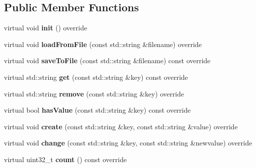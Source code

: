 \subsection*{Public Member Functions}
\begin{DoxyCompactItemize}
\item 
\mbox{\label{classbkengine_1_1INISettingsInterface_ad84a5d64d5cc69907d1cbfde8045e5c5}} 
virtual void {\bfseries init} () override
\item 
\mbox{\label{classbkengine_1_1INISettingsInterface_a08102628fa63304dd60d3dc47a38ea49}} 
virtual void {\bfseries load\+From\+File} (const std\+::string \&filename) override
\item 
\mbox{\label{classbkengine_1_1INISettingsInterface_aab677d0087cf7df2b42a2198c0700ff2}} 
virtual void {\bfseries save\+To\+File} (const std\+::string \&filename) const override
\item 
\mbox{\label{classbkengine_1_1INISettingsInterface_a8f8c91c1fb425e55422bec1d535e0c4e}} 
virtual std\+::string {\bfseries get} (const std\+::string \&key) const override
\item 
\mbox{\label{classbkengine_1_1INISettingsInterface_acf7c1800ed16171569ec7e29ab4ab371}} 
virtual std\+::string {\bfseries remove} (const std\+::string \&key) override
\item 
\mbox{\label{classbkengine_1_1INISettingsInterface_aeed7655aa361b07d69d2e97111cd20c7}} 
virtual bool {\bfseries has\+Value} (const std\+::string \&key) const override
\item 
\mbox{\label{classbkengine_1_1INISettingsInterface_afd51d34f3397ddb3c0f6ce3f7ecdd28d}} 
virtual void {\bfseries create} (const std\+::string \&key, const std\+::string \&value) override
\item 
\mbox{\label{classbkengine_1_1INISettingsInterface_a30c11f0fe030a3bba304962a6b1c77d1}} 
virtual void {\bfseries change} (const std\+::string \&key, const std\+::string \&newvalue) override
\item 
\mbox{\label{classbkengine_1_1INISettingsInterface_a58176c5b620d050afc30432a9ac08166}} 
virtual uint32\+\_\+t {\bfseries count} () const override
\end{DoxyCompactItemize}


